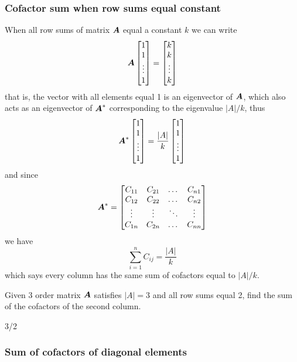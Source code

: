 \documentclass{overview}
\begin{document}
\subsubsection{Cofactor sum when row sums equal constant}

When all row sums of matrix $\boldsymbol{A}$ equal a constant $k$ we can write
\[
\boldsymbol{A} \begin{bmatrix} 1 \\ 1 \\ \vdots \\ 1 \end{bmatrix}
= \begin{bmatrix} k \\ k \\ \vdots \\ k \end{bmatrix}
\] 
that is, the vector with all elements equal 1 is an eigenvector of $\boldsymbol{A}$,
which also acts as an eigenvector of $\boldsymbol{A}^{*}$ corresponding to the
eigenvalue $|A|/k$, thus
\[
	\boldsymbol{A}^{*} \begin{bmatrix}
		1 \\
		1 \\
		\vdots \\
		1
	\end{bmatrix} = \frac{|A|}{k} \begin{bmatrix}
		1 \\
		1 \\
		\vdots \\
		1
	\end{bmatrix}
\] 
and since
\[
	\boldsymbol{A}^{*} =
\begin{bmatrix}
	C_{11} & C_{21} & \dots & C_{n1} \\
	C_{12} & C_{22} & \dots & C_{n2} \\
	\vdots & \vdots & \ddots & \vdots \\
	C_{1n} & C_{2n} & \dots & C_{nn} 
\end{bmatrix}
\] 
we have
\[
	\sum_{i=1}^{n} C_{ij} = \frac{|A|}{k}
\] 
which says every column has the same sum of cofactors equal to $|A|/k$.

\begin{example}
Given 3 order matrix $\boldsymbol{A}$ satisfies $|A|=3$ and all
row sums equal 2, find the sum of the cofactors of the second column.
\begin{answer}
 3/2
\end{answer}
\end{example}

\subsubsection{Sum of cofactors of diagonal elements}
\end{document}
